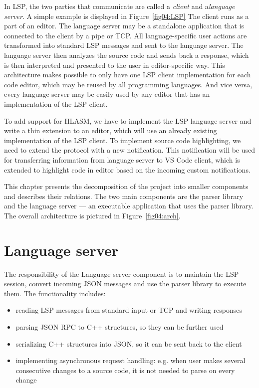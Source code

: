 In LSP, the two parties that communicate are called a \emph{client} and a\emph{language server}. A simple example is displayed in Figure~\cref{fig04:LSP} The client runs as a part of an editor. The language server may be a standalone application that is connected to the client by a pipe or TCP. All language-specific user actions are transformed into standard LSP messages and sent to the language server. The language server then analyzes the source code and sends back a response, which is then interpreted and presented to the user in editor-specific way. This architecture makes possible to only have one LSP client implementation for each code editor, which may be reused by all programming languages. And vice versa, every language server may be easily used by any editor that has an implementation of the LSP client.

To add support for HLASM, we have to implement the LSP language server and write a thin extension to an editor, which will use an already existing implementation of the LSP client. To implement source code highlighting, we need to extend the protocol with a new notification. This notification will be used for transferring information from language server to VS Code client, which is extended to highlight code in editor based on the incoming custom notifications.

This chapter presents the decomposition of the project into smaller components and describes their relations. The two main components are the parser library and the language server --- an executable application that uses the parser library. The overall architecture is pictured in Figure~\cref{fig04:arch}.

\section{Language server}

The responsibility of the Language server component is to maintain the LSP session, convert incoming JSON messages and use the parser library to execute them. The functionality includes:
\begin{itemize}
    \item reading LSP messages from standard input or TCP and writing responses
    \item parsing JSON RPC to C++ structures, so they can be further used
    \item serializing C++ structures into JSON, so it can be sent back to the client
    \item implementing asynchronous request handling: e.g. when user makes several consecutive changes to a source code, it is not needed to parse on every change
\end{itemize}

